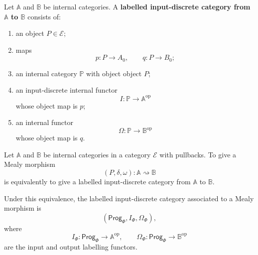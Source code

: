 \begin{definition}
\label{def:labelled-input-discrete-category}
Let \(\mathbb A\) and \(\mathbb B\) be internal categories. A \textbf{labelled input-discrete category from \(\mathbb A\) to \(\mathbb B\)} consists of:
\begin{enumerate}
\item an object \(P\in\mathcal E\);
\item maps
\[
p:P\to A_0,
\qquad
q:P\to B_0;
\]
\item an internal category \(\mathbb P\) with object object \(P\);
\item an input-discrete internal functor
\[
I:\mathbb P\to\mathbb A^{\mathrm{op}}
\]
whose object map is \(p\);
\item an internal functor
\[
\Omega:\mathbb P\to\mathbb B^{\mathrm{op}}
\]
whose object map is \(q\).
\end{enumerate}
\end{definition}

\begin{theorem}
\label{thm:mealy-as-labelled-discrete-opfibrations}
Let \(\mathbb A\) and \(\mathbb B\) be internal categories in a category \(\mathcal E\) with pullbacks. To give a Mealy morphism
\[
(P,\delta,\omega):\mathbb A\rightsquigarrow\mathbb B
\]
is equivalently to give a labelled input-discrete category from \(\mathbb A\) to \(\mathbb B\).

Under this equivalence, the labelled input-discrete category associated to a Mealy morphism is
\[
\left(
\mathsf{Prog}_\Phi,
I_\Phi,
\Omega_\Phi
\right),
\]
where
\[
I_\Phi:\mathsf{Prog}_\Phi\to\mathbb A^{\mathrm{op}},
\qquad
\Omega_\Phi:\mathsf{Prog}_\Phi\to\mathbb B^{\mathrm{op}}
\]
are the input and output labelling functors.
\end{theorem}

